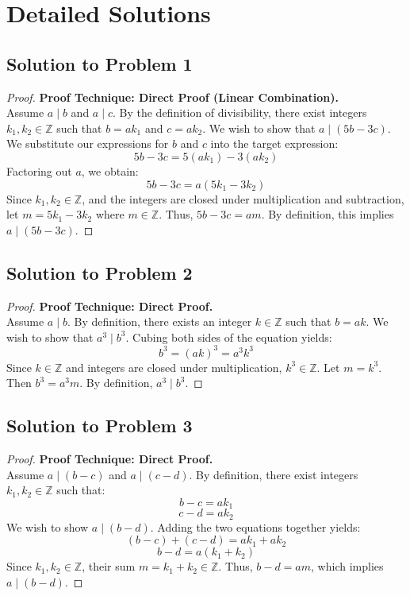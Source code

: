 \documentclass[12pt]{article}
\begin{document}
\newpage

\section{Detailed Solutions}

\subsection{Solution to Problem 1}
\begin{proof}
\textbf{Proof Technique: Direct Proof (Linear Combination).} \\
Assume $a \mid b$ and $a \mid c$. By the definition of divisibility, there exist integers $k_1, k_2 \in \mathbb{Z}$ such that $b = ak_1$ and $c = ak_2$. We wish to show that $a \mid (5b - 3c)$. We substitute our expressions for $b$ and $c$ into the target expression:
\[ 5b - 3c = 5(ak_1) - 3(ak_2) \]
Factoring out $a$, we obtain:
\[ 5b - 3c = a(5k_1 - 3k_2) \]
Since $k_1, k_2 \in \mathbb{Z}$, and the integers are closed under multiplication and subtraction, let $m = 5k_1 - 3k_2$ where $m \in \mathbb{Z}$. Thus, $5b - 3c = am$. By definition, this implies $a \mid (5b - 3c)$.
\end{proof}

\subsection{Solution to Problem 2}
\begin{proof}
\textbf{Proof Technique: Direct Proof.} \\
Assume $a \mid b$. By definition, there exists an integer $k \in \mathbb{Z}$ such that $b = ak$. We wish to show that $a^3 \mid b^3$. Cubing both sides of the equation yields:
\[ b^3 = (ak)^3 = a^3 k^3 \]
Since $k \in \mathbb{Z}$ and integers are closed under multiplication, $k^3 \in \mathbb{Z}$. Let $m = k^3$. Then $b^3 = a^3 m$. By definition, $a^3 \mid b^3$.
\end{proof}

\subsection{Solution to Problem 3}
\begin{proof}
\textbf{Proof Technique: Direct Proof.} \\
Assume $a \mid (b - c)$ and $a \mid (c - d)$. By definition, there exist integers $k_1, k_2 \in \mathbb{Z}$ such that:
\[ b - c = ak_1 \]
\[ c - d = ak_2 \]
We wish to show $a \mid (b - d)$. Adding the two equations together yields:
\[ (b - c) + (c - d) = ak_1 + ak_2 \]
\[ b - d = a(k_1 + k_2) \]
Since $k_1, k_2 \in \mathbb{Z}$, their sum $m = k_1 + k_2 \in \mathbb{Z}$. Thus, $b - d = am$, which implies $a \mid (b - d)$.
\end{proof}
\end{document}
